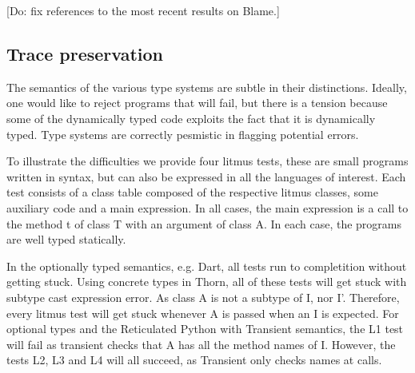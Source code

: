 \documentclass[a4paper,USenglish]{tex/lipics-v2016}
\begin{document}
[Do: fix references to the most recent results on Blame.]

\subsection{Trace preservation}

The semantics of the various type systems are subtle in their distinctions. Ideally,
one would like to reject programs that will fail, but there is a tension
because some of the dynamically typed code exploits the fact that it is
dynamically typed.  Type systems are correctly pesmistic in flagging
potential errors.

To illustrate the difficulties we provide four litmus tests, these are small
programs written in \kafka syntax, but can also be expressed in all the
languages of interest. Each test consists of a class table 
composed of the respective litmus classes, some auxiliary code and a main expression.
In all cases, the main expression is a call to the method t of class T with 
an argument of class A. In each case, the programs are well typed statically.

In the optionally typed semantics, e.g. Dart, all tests run to
completition without getting stuck. Using concrete types in Thorn, 
all of these tests will get stuck with subtype cast expression error. 
As class A is not a subtype of I, nor I'. Therefore, every litmus test will 
get stuck whenever A is passed when an I is expected.
For optional types and the Reticulated Python with Transient semantics, 
the L1 test will fail as transient checks that A has all the method names of I. 
However, the tests L2, L3 and L4 will all succeed, as Transient only checks names at calls.
\end{document}
